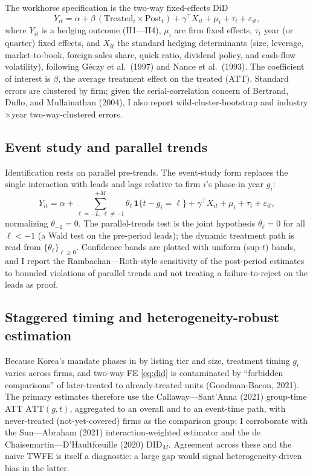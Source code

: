 \documentclass[11pt,a4paper]{article}
\begin{document}
The workhorse specification is the two-way fixed-effects DiD
\begin{equation}
Y_{it}=\alpha+\beta\,(\text{Treated}_i\times\text{Post}_t)+\gamma^\top X_{it}+\mu_i+\tau_t+\varepsilon_{it},
\label{eq:did}
\end{equation}
where $Y_{it}$ is a hedging outcome (H1---H4), $\mu_i$ are firm fixed effects, $\tau_t$ year (or quarter) fixed effects, and $X_{it}$ the standard hedging determinants (size, leverage, market-to-book, foreign-sales share, quick ratio, dividend policy, and cash-flow volatility), following G\'eczy et al.\ (1997) and Nance et al.\ (1993). The coefficient of interest is $\beta$, the average treatment effect on the treated (ATT). Standard errors are clustered by firm; given the serial-correlation concern of Bertrand, Duflo, and Mullainathan (2004), I also report wild-cluster-bootstrap and industry$\times$year two-way-clustered errors.

\subsection{Event study and parallel trends}
\label{sec:eventstudy}

Identification rests on parallel pre-trends. The event-study form replaces the single interaction with leads and lags relative to firm $i$'s phase-in year $g_i$:
\begin{equation}
Y_{it}=\alpha+\sum_{\ell=-L,\,\ell\ne-1}^{+M}\theta_\ell\,\mathbf 1\{t-g_i=\ell\}+\gamma^\top X_{it}+\mu_i+\tau_t+\varepsilon_{it},
\label{eq:eventstudy}
\end{equation}
normalizing $\theta_{-1}=0$. The parallel-trends test is the joint hypothesis $\theta_{\ell}=0$ for all $\ell<-1$ (a Wald test on the pre-period leads); the dynamic treatment path is read from $\{\theta_\ell\}_{\ell\ge0}$. Confidence bands are plotted with uniform (sup-$t$) bands, and I report the Rambachan---Roth-style sensitivity of the post-period estimates to bounded violations of parallel trends and not treating a failure-to-reject on the leads as proof.

\subsection{Staggered timing and heterogeneity-robust estimation}
\label{sec:staggered}

Because Korea's mandate phases in by listing tier and size, treatment timing $g_i$ varies across firms, and two-way FE \eqref{eq:did} is contaminated by ``forbidden comparisons'' of later-treated to already-treated units (Goodman-Bacon, 2021). The primary estimates therefore use the Callaway---Sant'Anna (2021) group-time ATT $\mathrm{ATT}(g,t)$, aggregated to an overall and to an event-time path, with never-treated (not-yet-covered) firms as the comparison group; I corroborate with the Sun---Abraham (2021) interaction-weighted estimator and the de Chaisemartin---D'Haultf\oe uille (2020) $\mathrm{DID}_M$. Agreement across these and the naive TWFE is itself a diagnostic: a large gap would signal heterogeneity-driven bias in the latter.
\end{document}
